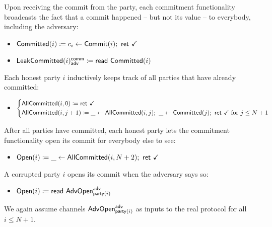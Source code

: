 Upon receiving the commit from the party, each commitment functionality broadcasts the fact that a commit happened -- but not its value -- to everybody, including the adversary:
\begin{itemize}
\item {\color{magenta} $\mathsf{Committed}(i) \coloneqq c_i \leftarrow \mathsf{Commit}(i); \ \mathsf{ret} \ \checkmark$}
\item {\color{magenta} $\mathsf{LeakCommitted}(i)^{\mathsf{comm}}_{\mathsf{adv}} \coloneqq \mathsf{read} \ \mathsf{Committed}(i)$}
\end{itemize}
Each honest party $i$ inductively keeps track of all parties that have already committed:
\begin{itemize}
\item {\color{magenta} $\begin{cases*} \AllCommitted(i,0) \coloneqq \ret{\checkmark} \\ \AllCommitted(i,j+1) \coloneqq \_ \leftarrow \AllCommitted(i,j); \ \_ \leftarrow \Committed(j); \ \ret{\checkmark} \text{ for $j \leq N+1$} \end{cases*}$}
\end{itemize}
After all parties have committed, each honest party lets the commitment functionality open its commit for everybody else to see:
\begin{itemize}
\item {\color{teal} $\Open(i) \coloneqq \_ \leftarrow \AllCommitted(i,N+2); \ \ret{\checkmark}$}
\end{itemize}
A corrupted party $i$ opens its commit when the adversary says so:
\begin{itemize}
\item {\color{teal} $\mathsf{Open}(i) \coloneqq \mathsf{read} \ \mathsf{AdvOpen}^{\mathsf{adv}}_{\mathsf{party}(i)}$}
\end{itemize}
We again assume channels $\mathsf{AdvOpen}^{\mathsf{adv}}_{\mathsf{party}(i)}$ as inputs to the real protocol for all $i \leq N+1$.

